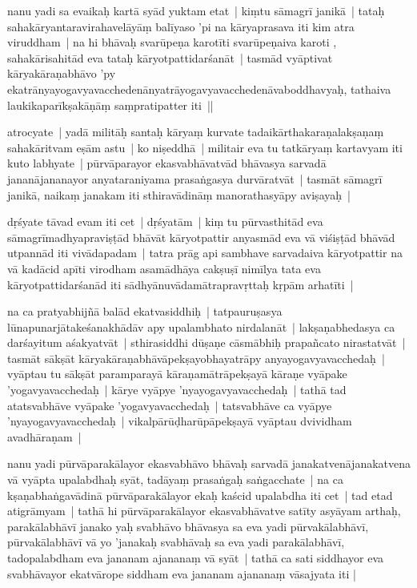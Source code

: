 \documentclass[article,12pt,a4paper]{memoir}
\begin{document}
	  \pstart nanu yadi sa evaikaḥ kartā syād yuktam etat | kiṃtu sāmagrī janikā | tataḥ sahakāryantaravirahavelāyāṃ balīyaso 'pi na kāryaprasava iti kim atra viruddham | na hi bhāvaḥ svarūpeṇa karotīti svarūpeṇaiva karoti , sahakārisahitād eva tataḥ kāryotpattidarśanāt | tasmād vyāptivat kāryakāraṇabhāvo 'py ekatrānyayogavyavacchedenānyatrāyogavyavacchedenāvaboddhavyaḥ, tathaiva laukikaparīkṣakāṇāṃ saṃpratipatter iti ||
	\pend
      

	  \pstart atrocyate | yadā militāḥ santaḥ kāryaṃ kurvate tadaikārthakaraṇalakṣaṇaṃ sahakāritvam eṣām astu | ko niṣeddhā | militair eva tu tatkāryaṃ kartavyam iti kuto labhyate | pūrvāparayor ekasvabhāvatvād bhāvasya sarvadā jananājananayor anyataraniyama prasaṅgasya durvāratvāt | tasmāt sāmagrī janikā, naikaṃ janakam iti sthiravādināṃ manorathasyāpy aviṣayaḥ |
	\pend
      

	  \pstart dṛśyate tāvad evam iti cet | dṛśyatām | kiṃ tu pūrvasthitād eva sāmagrīmadhyapraviṣṭād bhāvāt kāryotpattir anyasmād eva vā viśiṣṭād bhāvād utpannād iti vivādapadam | tatra prāg api sambhave sarvadaiva kāryotpattir na vā kadācid apīti virodham asamādhāya cakṣuṣī nimīlya tata eva kāryotpattidarśanād iti sādhyānuvādamātrapravṛttaḥ kṛpām arhatīti |
	\pend
      

	  \pstart na ca pratyabhijñā balād ekatvasiddhiḥ | tatpauruṣasya lūnapunarjātakeśanakhādāv apy upalambhato nirdalanāt | lakṣaṇabhedasya ca darśayitum aśakyatvāt | sthirasiddhi dūṣaṇe cāsmābhiḥ prapañcato nirastatvāt | \label{thakur75-75.22} tasmāt sākṣāt kāryakāraṇabhāvāpekṣayobhayatrāpy anyayogavyavacchedaḥ | vyāptau tu sākṣāt paramparayā kāraṇamātrāpekṣayā kāraṇe vyāpake 'yogavyavacchedaḥ | kārye vyāpye 'nyayogavyavacchedaḥ | tathā tad atatsvabhāve vyāpake 'yogavyavacchedaḥ | tatsvabhāve ca vyāpye 'nyayogavyavacchedaḥ | vikalpārūḍharūpāpekṣayā vyāptau dvividham avadhāraṇam |
	\pend
      

	  \pstart nanu yadi pūrvāparakālayor ekasvabhāvo bhāvaḥ sarvadā janakatvenājanakatvena vā vyāpta upalabdhaḥ syāt, tadāyaṃ prasaṅgaḥ saṅgacchate | na ca kṣaṇabhaṅgavādinā pūrvāparakālayor ekaḥ kaścid upalabdha iti cet | \label{thakur75-76.1} tad etad atigrāmyam | tathā hi pūrvāparakālayor ekasvabhāvatve satīty asyāyam arthaḥ, parakālabhāvī janako yaḥ svabhāvo bhāvasya sa eva yadi pūrvakālabhāvī, pūrvakālabhāvī vā yo 'janakaḥ svabhāvaḥ sa eva yadi parakālabhāvī, tadopalabdham eva jananam ajananaṃ vā syāt | tathā ca sati siddhayor eva svabhāvayor ekatvārope siddham eva jananam ajananaṃ vāsajyata iti |
	\pend
      
\end{document}
